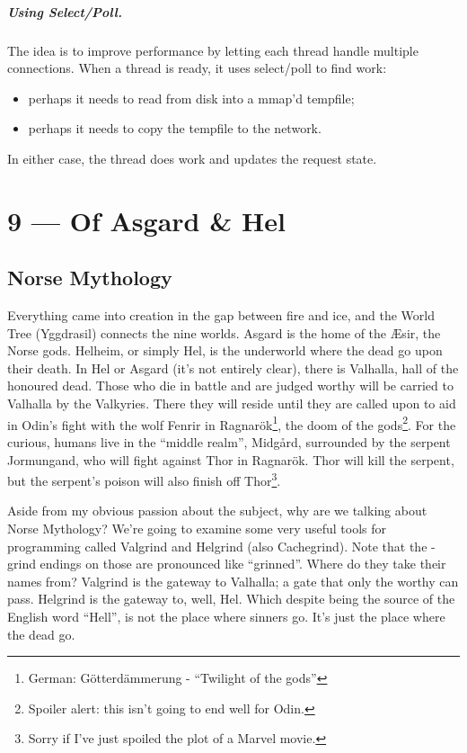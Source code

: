 \documentclass[a4paper]{report}
\begin{document}
\paragraph{Using Select/Poll.} The idea is to improve performance
by letting each thread handle multiple connections.
When a thread is ready, it uses select/poll to find work:
    \begin{itemize}
      \item perhaps it needs to read from disk into a mmap'd tempfile;
      \item perhaps it needs to copy the tempfile to the network.
    \end{itemize}

In either case, the thread does work and updates the request state.









\chapter*{9 --- Of Asgard \& Hel}


\section*{Norse Mythology}
Everything came into creation in the gap between fire and ice, and the World Tree (Yggdrasil) connects the nine worlds. Asgard is the home of the \AE sir, the Norse gods. Helheim, or simply Hel, is the underworld where the dead go upon their death. In Hel or Asgard (it's not entirely clear), there is Valhalla, hall of the honoured dead. Those who die in battle and are judged worthy will be carried to Valhalla by the Valkyries. There they will reside until they are called upon to aid in Odin's fight with the wolf Fenrir in Ragnar\"ok\footnote{German: G\"otterd\"ammerung - ``Twilight of the gods''}, the doom of the gods\footnote{Spoiler alert: this isn't going to end well for Odin.}. For the curious, humans live in the ``middle realm'', Midg\aa rd, surrounded by the serpent Jormungand, who will fight against Thor in  Ragnar\"ok. Thor will kill the serpent, but the serpent's poison will also finish off Thor\footnote{Sorry if I've just spoiled the plot of a Marvel movie.}.

Aside from my obvious passion about the subject, why are we talking about Norse Mythology? We're going to examine some very useful tools for programming called Valgrind and Helgrind (also Cachegrind). Note that the -grind endings on those are pronounced like ``grinned''. Where do they take their names from? Valgrind is the gateway to Valhalla; a gate that only the worthy can pass. Helgrind is the gateway to, well, Hel. Which despite being the source of the English word ``Hell'', is not the place where sinners go. It's just the place where the dead go.
\end{document}
